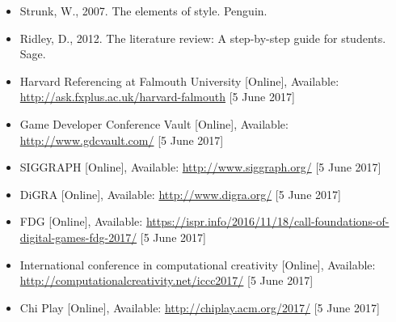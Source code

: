 \documentclass{../../fal_assignment}
\begin{document}
	\begin{itemize}
		\item Strunk, W., 2007. The elements of style. Penguin.
		\item Ridley, D., 2012. The literature review: A step-by-step guide for students. Sage.
		\item Harvard Referencing at Falmouth University [Online], Available: \url{http://ask.fxplus.ac.uk/harvard-falmouth} [5 June 2017]
		\item Game Developer Conference Vault [Online], Available: \url{http://www.gdcvault.com/} [5 June 2017]
		\item SIGGRAPH [Online], Available: \url{http://www.siggraph.org/}  [5 June 2017]
		\item DiGRA [Online], Available: \url{http://www.digra.org/}  [5 June 2017]
		\item FDG [Online], Available: \url{https://ispr.info/2016/11/18/call-foundations-of-digital-games-fdg-2017/}  [5 June 2017]
		\item International conference in computational creativity [Online], Available: \url{http://computationalcreativity.net/iccc2017/}  [5 June 2017]
		\item Chi Play [Online], Available: \url{http://chiplay.acm.org/2017/}  [5 June 2017]
		
		
	\end{itemize}
	
\end{document}
